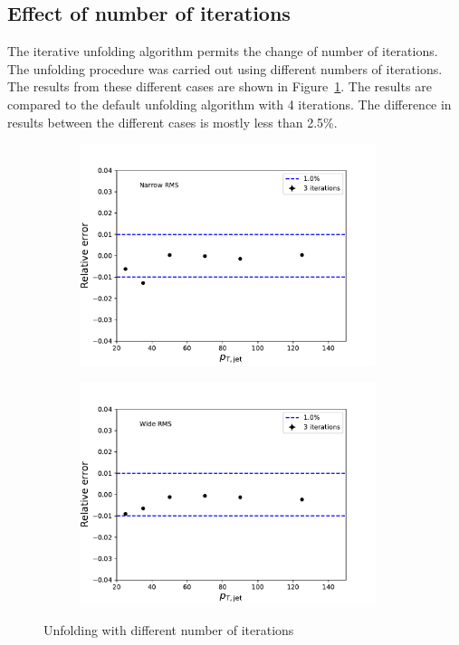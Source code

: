 \subsection{Effect of number of iterations}
\label{}
The iterative unfolding algorithm permits the change of number of iterations. The unfolding procedure was carried out using different numbers of iterations. The results from these different cases are shown in Figure~\ref{fig:iterations}. The results are compared to the default unfolding algorithm with 4 iterations. The difference in results between the different cases is mostly less than 2.5\%.
\begin{figure}
\centering
\begin{subfigure}{0.44\textwidth}
\includegraphics[width=0.95\textwidth]{figures/systematics/SystematicErrorsGausRMS_iterations.pdf}
\end{subfigure}
\begin{subfigure}{0.44\textwidth}
\includegraphics[width=0.95\textwidth]{figures/systematics/SystematicErrorsGammaRMS_iterations.pdf}
\end{subfigure}
\caption{Unfolding with different number of iterations}
\label{fig:iterations}
\end{figure}

